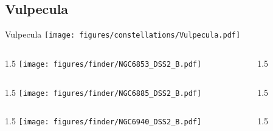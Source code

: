 \documentclass[final]{beamer}
\newlength{\colwidth}
\begin{document}
\subsection{Vulpecula}

\begin{frame}[t]{\LARGE Vulpecula}
  \centering
  \texttt{[image: figures/constellations/Vulpecula.pdf]}
\end{frame}


\begin{frame}[t]{}
  \begin{columns}[T]
    \begin{column}{1.5\colwidth}
      \centering
      \texttt{[image: figures/finder/NGC6853\_DSS2\_B.pdf]}
    \end{column}
    \begin{column}{1.5\colwidth}
      \Large
      
    \end{column}
  \end{columns}
  \vspace{\fill}
  \begin{columns}[T]
    \begin{column}{1.5\colwidth}
      \centering
      \texttt{[image: figures/finder/NGC6885\_DSS2\_B.pdf]}
    \end{column}
    \begin{column}{1.5\colwidth}
      \Large
      
    \end{column}
  \end{columns}
\end{frame}

\begin{frame}[t]{}
  \begin{columns}[T]
    \begin{column}{1.5\colwidth}
      \centering
      \texttt{[image: figures/finder/NGC6940\_DSS2\_B.pdf]}
    \end{column}
    \begin{column}{1.5\colwidth}
      \Large
      
    \end{column}
  \end{columns}
  \vspace{\fill}
\end{frame}
\end{document}

